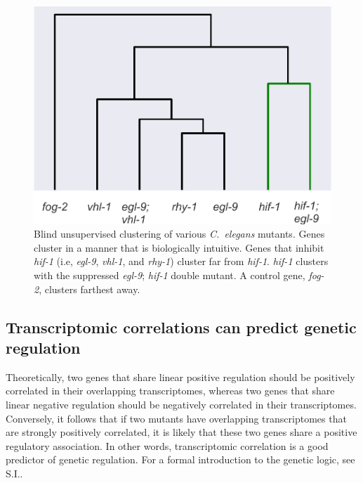 \documentclass[9pt,twocolumn,twoside]{pnas-new}
\newcommand{\cel}{\emph{C.~elegans}}
\newcommand{\egl}{\emph{egl-9}}
\newcommand{\rhy}{\emph{rhy-1}}
\newcommand{\vhl}{\emph{vhl-1}}
\newcommand{\hif}{\emph{hif-1}}
\newcommand{\fog}{\emph{fog-2}}
\begin{document}
\begin{figure}%
\centering
\includegraphics[width=\linewidth]{figs/dendrogram.pdf}
\caption{Blind unsupervised clustering of various \cel{} mutants. Genes cluster in a manner that is biologically intuitive. Genes that inhibit \hif{} (i.e, \egl{}, \vhl{}, and \rhy{}) cluster far from \hif{}. \hif{} clusters with the suppressed \egl{}; \hif{} double mutant. A control gene, \fog{}, clusters farthest away.}
\label{fig:dendrogram}
\end{figure}

\subsection{Transcriptomic correlations can predict genetic regulation}
\label{sub:Transcriptomic genetic analyses}

Theoretically, two genes that share linear positive regulation should be positively correlated in their overlapping transcriptomes, whereas two genes that share linear negative regulation should be negatively correlated in their transcriptomes.
Conversely, it follows that if two mutants have overlapping transcriptomes that are strongly positively correlated, it is likely that these two genes share a positive regulatory association. In other words, transcriptomic correlation is a good predictor of genetic regulation. For a formal introduction to the genetic logic, see S.I..
\end{document}
